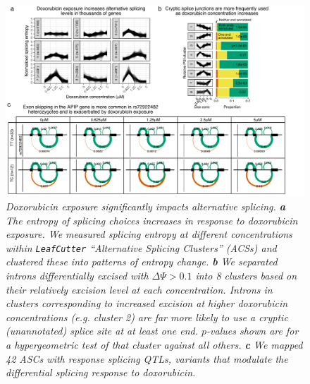 \documentclass{article}
\begin{document}
\begin{figure}
\begin{center}
    \includegraphics[width=1\textwidth]{../figures/fig3_splicing.pdf}     \caption{\it{Doxorubicin exposure significantly impacts alternative splicing. \textbf{a} The entropy of splicing choices increases in response to doxorubicin exposure. We measured splicing entropy at different concentrations within \texttt{LeafCutter} ``Alternative Splicing Clusters'' (ACSs) and clustered these into patterns of entropy change. \textbf{b} We separated introns differentially excised with $\Delta \Psi > 0.1$ into 8 clusters based on their relatively excision level at each concentration. Introns in clusters corresponding to increased excision at higher doxorubicin concentrations (e.g. cluster 2) are far more likely to use a cryptic (unannotated) splice site at at least one end. $p$-values shown are for a hypergeometric test of that cluster against all others. \textbf{c} We mapped 42 ASCs with response splicing QTLs, variants that modulate the differential splicing response to doxorubicin.}}
    \label{fig_splicing}
    \end{center}
\end{figure}
\end{document}
